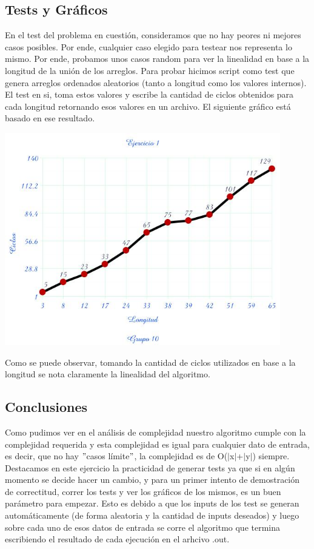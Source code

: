 \subsection{Tests y Gráficos}
En el test del problema en cuestión, consideramos que no hay peores ni mejores casos posibles.
Por ende, cualquier caso elegido para testear nos representa lo mismo.
Por ende, probamos unos casos random para ver la linealidad en base a la longitud de la unión de los arreglos.
Para probar hicimos script como test que genera arreglos ordenados aleatorios (tanto a longitud como los valores internos).
El test en si, toma estos valores y escribe la cantidad de ciclos obtenidos para cada longitud retornando esos valores en un archivo.
El siguiente gráfico está basado en ese resultado.


\begin {center}
\includegraphics[width=12cm]{./graphEj1.jpg}
\end {center}

Como se puede observar, tomando la cantidad de ciclos utilizados en base a la longitud se nota claramente la linealidad
del algoritmo.


\subsection{Conclusiones}
Como pudimos ver en el análisis de complejidad nuestro algoritmo cumple con la complejidad requerida y esta complejidad es igual para cualquier dato de entrada, es decir, que no hay $"$casos límite$"$, la complejidad es de O($|$x$|$+$|$y$|$) siempre.
Destacamos en este ejercicio la practicidad de generar tests ya que si en algún momento se decide hacer un cambio, y para un primer intento de demostración de correctitud,
correr los tests y ver los gráficos de los mismos, es un buen parámetro para empezar. Esto es debido a que los inputs de los test se generan automáticamente (de forma
aleatoria y la cantidad de inputs deseados) y luego sobre cada uno de esos datos de entrada se corre el algoritmo que termina escribiendo el resultado de cada ejecución en
el arhcivo .out.
